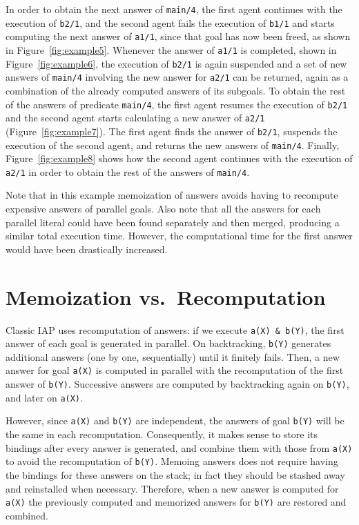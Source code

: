 \documentclass{tlp}
\newcommand{\compressection}{\vspace{-1em}}
\begin{document}
In order to obtain the next answer of \lstinline{main/4}, the first
agent continues with the execution of \lstinline{b2/1}, and the second
agent fails the execution of \lstinline{b1/1} and starts computing the
next answer of \lstinline{a1/1}, since that goal has now been freed,
as shown in Figure~\ref{fig:example5}. Whenever the answer of
\lstinline{a1/1} is completed, shown in Figure~\ref{fig:example6}, the
execution of \lstinline{b2/1} is again suspended and a set of new
answers of \lstinline{main/4} involving the new answer for
\lstinline{a2/1} can be returned, again as a combination of the
already computed answers of its subgoals. To obtain the rest of the
answers of predicate \lstinline{main/4}, the first agent resumes the
execution of \lstinline{b2/1} and the second agent starts calculating
a new answer of \lstinline{a2/1} (Figure~\ref{fig:example7}). The
first agent finds the answer of \lstinline{b2/1}, suspends the
execution of the second agent, and returns the new answers of
\lstinline{main/4}. Finally, Figure~\ref{fig:example8} shows how the
second agent continues with the execution of \lstinline{a2/1} in order
to obtain the rest of the answers of \lstinline{main/4}.

Note that in this example memoization of answers avoids having to
recompute expensive answers of parallel goals. Also note that all the
answers for each parallel literal could have been found separately
and then merged, producing a similar total execution time. However,
the computational time for the first answer would have been
drastically increased.

\compressection
\section{Memoization vs.\  Recomputation}
\label{sec:reusing-answers}

Classic IAP uses recomputation of answers: if we execute
\lstinline{a(X) & b(Y)}, the first answer of each goal is generated in
parallel.  On backtracking, \lstinline{b(Y)} generates additional
answers (one by one, sequentially) until it finitely fails.  Then, a
new answer for goal \lstinline{a(X)} is computed in parallel with the
recomputation of the first answer of \lstinline{b(Y)}.  Successive
answers are computed by backtracking again on \lstinline{b(Y)}, and
later on \lstinline{a(X)}.


However, since \lstinline{a(X)} and \lstinline{b(Y)} are independent,
the answers of goal \lstinline{b(Y)} will be the same in each
recomputation.  Consequently, it makes sense to store its bindings
after every answer is generated, and combine them with those from
\lstinline{a(X)} to avoid the recomputation of \lstinline{b(Y)}.
Memoing answers does not require having the bindings for these answers
on the stack; in fact they should be stashed away and reinstalled when necessary.  Therefore, when a new answer is
computed for \lstinline{a(X)}
the previously computed and memorized answers for
\lstinline{b(Y)} are restored and combined.
\end{document}

